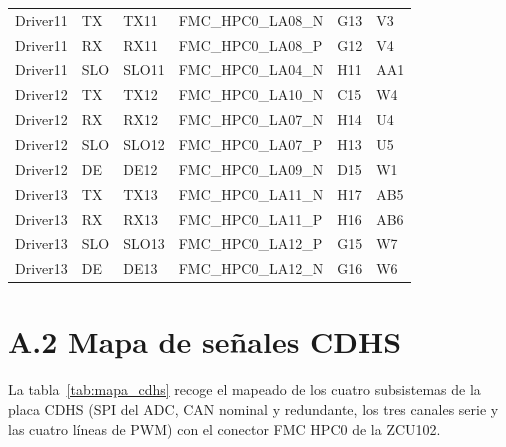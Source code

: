 {\begin{longtable}{llllll}
    Driver11 & TX  & TX11  & FMC\_HPC0\_LA08\_N     & G13 & V3   \\
    Driver11 & RX  & RX11  & FMC\_HPC0\_LA08\_P     & G12 & V4   \\
    Driver11 & SLO & SLO11 & FMC\_HPC0\_LA04\_N     & H11 & AA1  \\
    Driver12 & TX  & TX12  & FMC\_HPC0\_LA10\_N     & C15 & W4   \\
    Driver12 & RX  & RX12  & FMC\_HPC0\_LA07\_N     & H14 & U4   \\
    Driver12 & SLO & SLO12 & FMC\_HPC0\_LA07\_P     & H13 & U5   \\
    Driver12 & DE  & DE12  & FMC\_HPC0\_LA09\_N     & D15 & W1   \\
    Driver13 & TX  & TX13  & FMC\_HPC0\_LA11\_N     & H17 & AB5  \\
    Driver13 & RX  & RX13  & FMC\_HPC0\_LA11\_P     & H16 & AB6  \\
    Driver13 & SLO & SLO13 & FMC\_HPC0\_LA12\_P     & G15 & W7   \\
    Driver13 & DE  & DE13  & FMC\_HPC0\_LA12\_N     & G16 & W6   \\
\end{longtable}
}

\section*{A.2 Mapa de señales CDHS}

La tabla~\ref{tab:mapa_cdhs} recoge el mapeado de los cuatro subsistemas de la placa CDHS (SPI del
ADC, CAN nominal y redundante, los tres canales serie y las cuatro líneas de PWM) con el conector
FMC HPC0 de la ZCU102.

